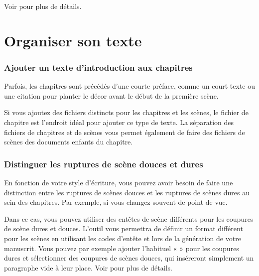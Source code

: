 \documentclass[a4paper,11pt,french]{sphinxmanual}
\begin{document}
\sphinxAtStartPar
Voir {\hyperref[\detokenize{usage_format:a-fmt-align}]{}} pour plus de détails.


\section{Organiser son texte}
\label{\detokenize{int_howto:organising-your-text}}\subsubsection*{Ajouter un texte d’introduction aux chapitres}

\sphinxAtStartPar
Parfois, les chapitres sont précédés d’une courte préface, comme un court texte ou une citation pour planter le décor avant le début de la première scène.

\sphinxAtStartPar
Si vous ajoutez des fichiers distincts pour les chapitres et les scènes, le fichier de chapitre est l’endroit idéal pour ajouter ce type de texte. La séparation des fichiers de chapitres et de scènes vous permet également de faire des fichiers de scènes des documents enfants du chapitre.
\subsubsection*{Distinguer les ruptures de scène douces et dures}

\sphinxAtStartPar
En fonction de votre style d’écriture, vous pouvez avoir besoin de faire une distinction entre les ruptures de scènes douces et les ruptures de scènes dures au sein des chapitres. Par exemple, si vous changez souvent de point de vue.

\sphinxAtStartPar
Dans ce cas, vous pouvez utiliser des en\sphinxhyphen{}têtes de scène différents pour les coupures de scène dures et douces. L’outil  vous permettra de définir un format différent pour les scènes en utilisant les codes d’en\sphinxhyphen{}tête \sphinxcode{\sphinxupquote{\#\#\#}} et \sphinxcode{\sphinxupquote{\#\#\#!}} lors de la génération de votre manuscrit. Vous pouvez par exemple ajouter l’habituel « \sphinxcode{\sphinxupquote{* * *}} » pour les coupures dures et sélectionner des coupures de scènes douces, qui inséreront simplement un paragraphe vide à leur place. Voir {\hyperref[\detokenize{project_manuscript:a-manuscript-settings}]{}} pour plus de détails.
\end{document}

